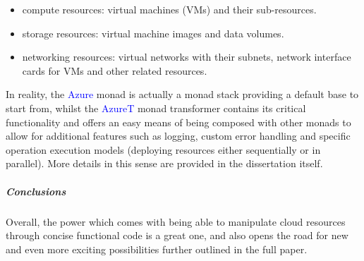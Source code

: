 \documentclass[11pt]{article}
\begin{document}
\begin{itemize}

    \item{} compute resources: virtual machines (VMs) and their sub-resources.
    \item{} storage resources: virtual machine images and data volumes.
    \item{} networking resources: virtual networks with their subnets, network
        interface cards for VMs and other related resources.

\end{itemize}

In reality, the \textcolor{blue}{Azure} monad is actually a monad stack
providing a default base to start from, whilst the \textcolor{blue}{AzureT}
monad transformer contains its critical functionality and offers an easy means
of being composed with other monads to allow for additional features such as
logging, custom error handling and specific operation execution models
(deploying resources either sequentially or in parallel). More details in this
sense are provided in the dissertation itself.

\subparagraph{Conclusions}

Overall, the power which comes with being able to manipulate cloud resources
through concise functional code is a great one, and also opens the road for new
and even more exciting possibilities further outlined in the full paper.
\end{document}
